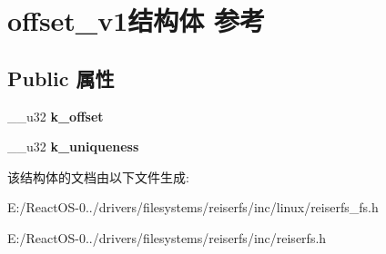 \hypertarget{structoffset__v1}{}\section{offset\+\_\+v1结构体 参考}
\label{structoffset__v1}
\subsection*{Public 属性}
\begin{DoxyCompactItemize}
\item 
\mbox{\label{structoffset__v1_ac85161073de3f337c720a4b2ed4c2434}} 
\+\_\+\+\_\+u32 {\bfseries k\+\_\+offset}
\item 
\mbox{\label{structoffset__v1_acca99285a6d8f727cd2889e5d0c35041}} 
\+\_\+\+\_\+u32 {\bfseries k\+\_\+uniqueness}
\end{DoxyCompactItemize}


该结构体的文档由以下文件生成\+:\begin{DoxyCompactItemize}
\item 
E\+:/\+React\+O\+S-\/0../drivers/filesystems/reiserfs/inc/linux/reiserfs\+\_\+fs.\+h\item 
E\+:/\+React\+O\+S-\/0../drivers/filesystems/reiserfs/inc/reiserfs.\+h\end{DoxyCompactItemize}

